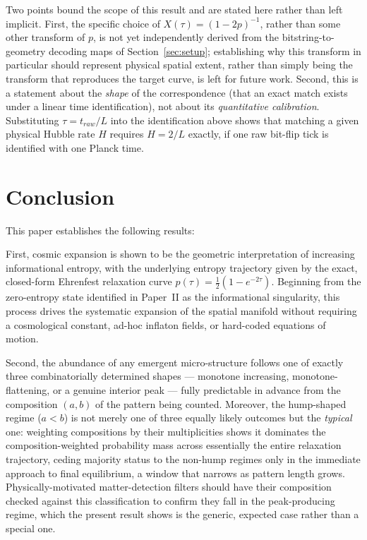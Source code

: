 \documentclass[11pt]{article}
\begin{document}
Two points bound the scope of this result and are stated here rather than left implicit. First, the specific
choice of $X(\tau)=(1-2p)^{-1}$, rather than some other transform of $p$, is not yet independently derived
from the bitstring-to-geometry decoding maps of Section~\ref{sec:setup}; establishing why this transform in
particular should represent physical spatial extent, rather than simply being the transform that reproduces
the target curve, is left for future work. Second, this is a statement about the \emph{shape} of the
correspondence (that an exact match exists under a linear time identification), not about its
\emph{quantitative calibration}. Substituting $\tau=t_{raw}/L$ into the identification above shows that
matching a given physical Hubble rate $H$ requires $H=2/L$ exactly, if one raw bit-flip tick is identified
with one Planck time.

\section{Conclusion}
\label{sec:conclusion}

This paper establishes the following results:

First, cosmic expansion is shown to be the geometric interpretation of increasing informational entropy,
with the underlying entropy trajectory given by the exact, closed-form Ehrenfest relaxation curve
$p(\tau)=\tfrac12(1-e^{-2\tau})$.
Beginning from the zero-entropy state identified in Paper~II \cite{meskanen2002} as the informational singularity,
this process drives the systematic expansion of the spatial manifold without requiring a cosmological constant,
ad-hoc inflaton fields, or hard-coded equations of motion.

Second, the abundance of any emergent micro-structure follows one of exactly three combinatorially
determined shapes --- monotone increasing, monotone-flattening, or a genuine interior peak --- fully
predictable in advance from the composition $(a,b)$ of the pattern being counted. Moreover, the hump-shaped
regime ($a<b$) is not merely one of three equally likely outcomes but the \emph{typical} one: weighting
compositions by their multiplicities shows it dominates the composition-weighted probability mass across
essentially the entire relaxation trajectory, ceding majority status to the non-hump regimes only in the
immediate approach to final equilibrium, a window that narrows as pattern length grows. Physically-motivated
matter-detection filters should have their composition checked against this classification to confirm they
fall in the peak-producing regime, which the present result shows is the generic, expected case rather than
a special one.
\end{document}
